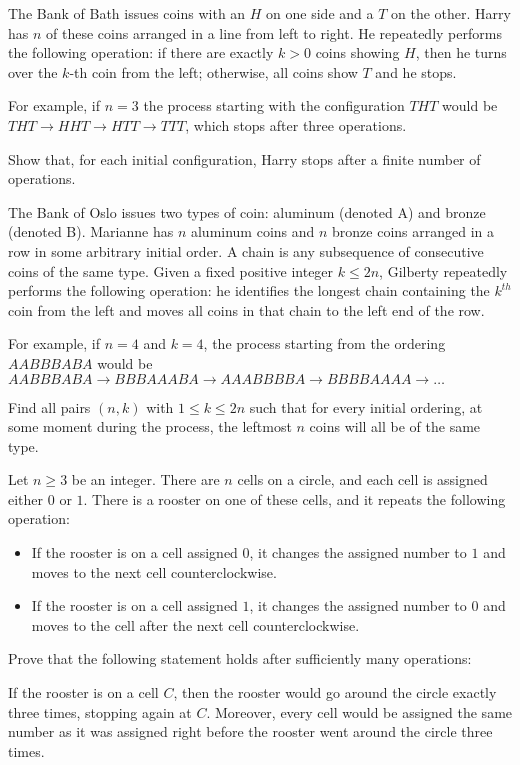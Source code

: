 \begin{problem}[IMO 2019]
    The Bank of Bath issues coins with an $H$ on one side and a $T$ on the other. Harry has $n$ of these coins arranged in a line from left to right. He repeatedly performs the following operation: if there are exactly $k>0$ coins showing $H$, then he turns over the $k$-th coin from the left; otherwise, all coins show $T$ and he stops.

    For example, if $n=3$ the process starting with the configuration $THT$ would be $THT \to HHT \to HTT \to TTT$, which stops after three operations.

    Show that, for each initial configuration, Harry stops after a finite number of operations.
\end{problem}

\begin{problem}[IMO 2022]
    The Bank of Oslo issues two types of coin: aluminum (denoted A) and bronze (denoted B). Marianne has $n$ aluminum coins and $n$ bronze coins arranged in a row in some arbitrary initial order. A chain is any subsequence of consecutive coins of the same type. Given a fixed positive integer $k \leq 2n$, Gilberty repeatedly performs the following operation: he identifies the longest chain containing the $k^{th}$ coin from the left and moves all coins in that chain to the left end of the row.

    For example, if $n=4$ and $k=4$, the process starting from the ordering $AABBBABA$ would be $AABBBABA \to BBBAAABA \to AAABBBBA \to BBBBAAAA \to \dots$

    Find all pairs $(n,k)$ with $1 \leq k \leq 2n$ such that for every initial ordering, at some moment during the process, the leftmost $n$ coins will all be of the same type.
\end{problem}

\begin{problem}[APMO 2025]
    Let $n \geq 3$ be an integer. There are $n$ cells on a circle, and each cell is assigned either $0$ or $1$. There is a rooster on one of these cells, and it repeats the following operation:
    \begin{itemize}
        \item If the rooster is on a cell assigned $0$, it changes the assigned number to $1$ and moves to the next cell counterclockwise.
        \item If the rooster is on a cell assigned $1$, it changes the assigned number to $0$ and moves to the cell after the next cell counterclockwise.
    \end{itemize}
    Prove that the following statement holds after sufficiently many operations:

    If the rooster is on a cell $C$, then the rooster would go around the circle exactly three times, stopping again at $C$. Moreover, every cell would be assigned the same number as it was assigned right before the rooster went around the circle three times.
\end{problem}

